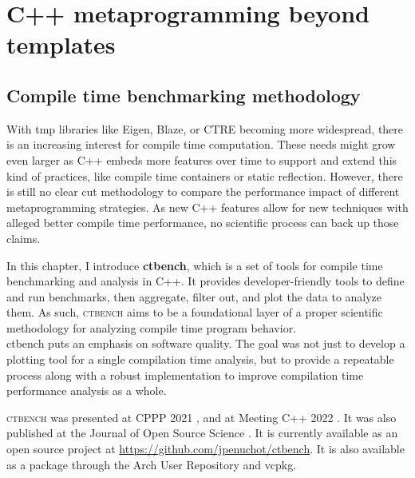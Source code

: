 \documentclass[english,12pt,a4paper]{book}
\providecommand{\cpp}{\textsc{C++}\xspace}
\providecommand{\ctbench}{\textsc{ctbench}\xspace}
\begin{document}


\part{C++ metaprogramming beyond templates}

\chapter{
  Compile time benchmarking methodology
}

With \gls{tmp} libraries like Eigen\cite{eigen}, Blaze\cite{blazelib},
or CTRE \cite{ctre} becoming more widespread,
there is an increasing interest for compile time computation.
These needs might grow
even larger as \cpp embeds more features over time to support and extend this
kind of practices, like compile time containers \cite{more-constexpr-containers}
or static reflection\cite{static-reflection}. However, there is still no clear
cut methodology to compare the performance impact of different metaprogramming
strategies.
As new \cpp features allow for new techniques with alleged
better compile time performance, no scientific process can back up those claims.

In this chapter, I introduce \textbf{ctbench}, which is a set of tools for
compile time benchmarking and analysis in \cpp. It provides developer-friendly
tools
to define and run benchmarks, then aggregate, filter out, and plot the data to
analyze them. As such, \ctbench aims to be a foundational layer of a proper
scientific methodology for analyzing compile time program behavior.
\\

ctbench puts an emphasis on software quality.
The goal was not just to develop a plotting tool for a single
compilation time analysis, but to provide a repeatable process
along with a robust implementation to improve compilation time
performance analysis as a whole.



\ctbench was presented at CPPP 2021 \cite{ctbench-cppp21},
and at Meeting \cpp 2022 \cite{meetingcpp22}. It was also published
at the Journal of Open Source Science \cite{Penuchot2023}.
It is currently available as an open source project at
\url{https://github.com/jpenuchot/ctbench}.
It is also available as a package through the Arch User Repository and vcpkg.
\end{document}
